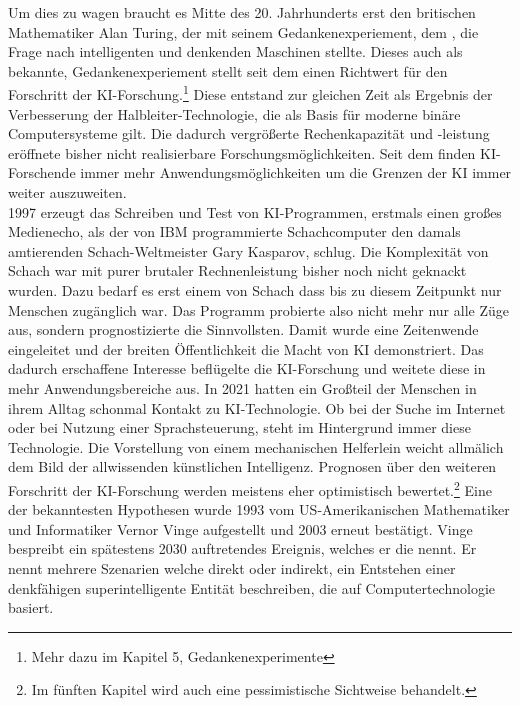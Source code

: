 \documentclass[12pt,german,ngerman]{report}
\begin{document}
Um dies zu wagen braucht es Mitte des 20. Jahrhunderts erst den britischen Mathematiker Alan Turing, 
der mit seinem Gedankenexperiement, dem , die Frage nach intelligenten und denkenden Maschinen stellte.
Dieses auch als  bekannte, Gedankenexperiement stellt seit dem einen Richtwert für den Forschritt der KI-Forschung.\footnote{Mehr dazu im Kapitel 5, Gedankenexperimente}
Diese entstand zur gleichen Zeit als Ergebnis der Verbesserung der Halbleiter-Technologie, die als Basis für 
moderne binäre Computersysteme gilt. Die dadurch vergrößerte Rechenkapazität und -leistung eröffnete bisher nicht realisierbare Forschungsmöglichkeiten. 
Seit dem finden KI-Forschende immer mehr Anwendungsmöglichkeiten um die Grenzen der KI immer weiter auszuweiten.\\

1997 erzeugt das Schreiben und Test von KI-Programmen, erstmals einen großes Medienecho, als der von IBM programmierte Schachcomputer
 den damals amtierenden Schach-Weltmeister Gary Kasparov, schlug.\cite{chessbase2017kasparovdeepblue} Die Komplexität von Schach war mit purer brutaler
Rechnenleistung bisher noch nicht geknackt wurden. Dazu bedarf es erst einem  von Schach dass bis zu diesem
Zeitpunkt nur Menschen zugänglich war. Das Programm probierte also nicht mehr nur alle Züge aus, sondern prognostizierte die 
Sinnvollsten. Damit wurde eine Zeitenwende eingeleitet und der breiten Öffentlichkeit die Macht von KI demonstriert.
Das dadurch erschaffene Interesse beflügelte die KI-Forschung und weitete diese in mehr Anwendungsbereiche aus.
In 2021 hatten ein Großteil der Menschen in ihrem Alltag schonmal Kontakt zu KI-Technologie. 
Ob bei der Suche im Internet oder bei Nutzung einer Sprachsteuerung, steht im Hintergrund immer diese Technologie.
Die Vorstellung von einem mechanischen Helferlein weicht allmälich dem Bild der allwissenden künstlichen Intelligenz.
Prognosen über den weiteren Forschritt der KI-Forschung werden meistens eher optimistisch bewertet.\footnote{Im fünften Kapitel wird auch eine pessimistische Sichtweise behandelt.} 
Eine der bekanntesten Hypothesen wurde 1993 vom US-Amerikanischen Mathematiker und Informatiker Vernor Vinge aufgestellt und 2003
erneut bestätigt. Vinge bespreibt ein spätestens 2030 auftretendes Ereignis, welches er die \cite[1]{vinge1993technological} nennt. 
Er nennt mehrere Szenarien welche direkt oder indirekt, ein Entstehen einer denkfähigen superintelligente Entität beschreiben, die auf Computertechnologie basiert.\\
\end{document}
